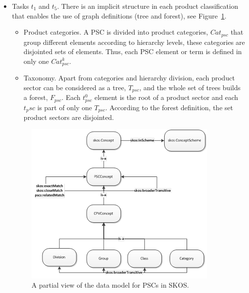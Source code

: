 \begin{itemize}
 \item Tasks $t_1$ and $t_5$. There is an implicit structure in each product classification 
 that enables the use of graph definitions (tree and forest), see Figure~\ref{fig:pscs-data-model}.
 \begin{itemize}
  \item Product categories. A PSC is divided into product categories, $Cat_{psc}$ that group different elements according to hierarchy levels, 
  these categories are disjointed sets of elements. Thus, each PSC element or term is defined in only one $Cat^k_{psc}$.
  \item Taxonomy. Apart from categories and hierarchy division, each product sector can be considered as a tree, $T_{psc}$, 
  and the whole set of trees builds a forest, $F_{psc}$. Each $t^0_{psc}$  element is the root of a product sector and each $t_psc$ 
  is part of only one $T_{psc}$. According to the forest definition, the set product sectors are disjointed.
 \end{itemize}

 \begin{figure}[!ht]
\centering
	\includegraphics[width=\textwidth]{./imgs/fig-2}
 \caption{A partial view of the data model for PSCs in SKOS.}
 \label{fig:pscs-data-model}
\end{figure}



\end{itemize}
